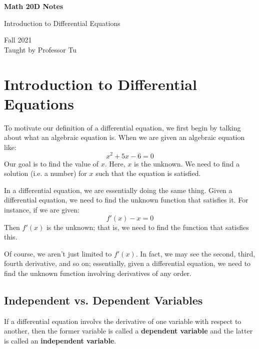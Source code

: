 \documentclass[letterpaper]{article}
\begin{document}
\begin{titlepage}
    \begin{center}
        \vspace*{1cm}
            
        \Huge
        \textbf{Math 20D Notes}
            
        \vspace{0.5cm}
        \LARGE
        Introduction to Differential Equations
            
        \vspace{1.5cm}
            
        \vfill
            
        Fall 2021\\
        Taught by Professor Tu
    \end{center}
\end{titlepage}


\newpage 

\begingroup
    \renewcommand\contentsname{Table of Contents}
    \tableofcontents
\endgroup

\newpage
{}

\section{Introduction to Differential Equations}
To motivate our definition of a differential equation, we first begin by talking about what an algebraic equation is. When we are given an algebraic equation like: 
\[x^2 + 5x - 6 = 0\]
Our goal is to find the value of $x$. Here, $x$ is the unknown. We need to find a solution (i.e. a number) for $x$ such that the equation is satisfied. 

\bigskip 

In a differential equation, we are essentially doing the same thing. Given a differential equation, we need to find the unknown function that satisfies it. For instance, if we are given: 
\[f'(x) - x = 0\]
Then $f'(x)$ is the unknown; that is, we need to find the function that satisfies this.

\bigskip 

Of course, we aren't just limited to $f'(x)$. In fact, we may see the second, third, fourth derivative, and so on; essentially, given a differential equation, we need to find the unknown function involving derivatives of any order. 

\subsection{Independent vs. Dependent Variables}
If a differential equation involvs the derivative of one variable with respect to another, then the former variable is called a \textbf{dependent variable} and the latter is called an \textbf{independent variable}. 
\end{document}
